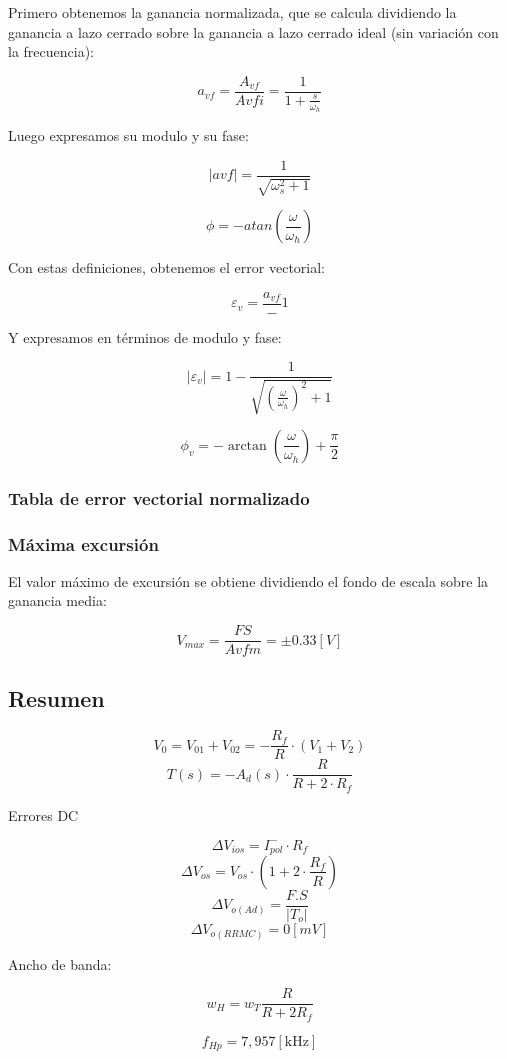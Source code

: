Primero obtenemos la ganancia normalizada, que se calcula dividiendo la ganancia a lazo cerrado sobre la ganancia a lazo cerrado ideal (sin variación con la frecuencia):

\[ a_{vf} = \frac{A_{vf}}{A{vfi}} = \frac{1}{1 + \frac{s}{\omega_h}} \]

Luego expresamos su modulo y su fase:

\[ |avf| = \frac{1}{\sqrt{\omega^2_s + 1}} \]


\[ \phi = -atan\left(\frac{\omega}{\omega_h}\right) \]

Con estas definiciones, obtenemos el error vectorial:

\[ \varepsilon_v = \frac{a_{vf}} - 1 \]

Y expresamos en términos de modulo y fase:

\[ |\varepsilon_v| = 1 - \frac{1}{\sqrt{\left(\frac{\omega}{\omega_{h}}\right)^2 + 1}} \]

\[ \phi_v = -\arctan\left(\frac{\omega}{\omega_h}\right) + \frac{\pi}{2} \]


\subsubsection{Tabla de error vectorial normalizado}


\subsubsection{Máxima excursión}
El valor máximo de excursión se obtiene dividiendo el fondo de escala sobre la ganancia media:

\[ V_{max}=\frac{F S}{Avfm} =  \pm 0.33[ V ] \]




\subsection{Resumen}

\[V_{0} = V_{01} + V_{02} = - \frac{R_f}{R} \cdot (V_1 + V_2) \]
\[T (s) = -A_d (s) \cdot  \frac{R}{R + 2\cdot R_f}\]


Errores DC

\[ \Delta V_{ios} = I_{pol}^{-} \cdot R_f \]
\[ \Delta V_{os}  = V_{os} \cdot (1 + 2 \cdot \frac {R_f}{R} )\]
\[ \Delta V_{o (Ad)}=\frac{F.S}{\left|T_{o}\right|}\]
\[ \Delta V_{o (RRMC) } = 0 [ mV ]\]
 
Ancho de banda:

\[ w_H = w_{T} \frac{R}{R+2 R_f} \]

\[ f_{Hp}=7,957[\mathrm{kHz}] \]
 


